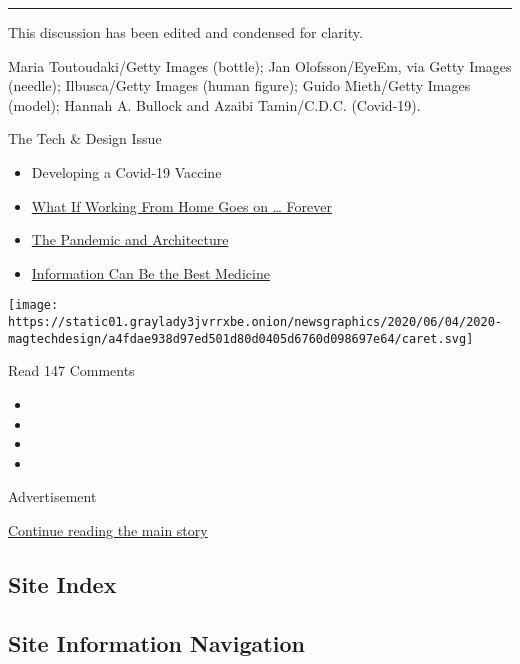 \begin{center}\rule{0.5\linewidth}{\linethickness}\end{center}

This discussion has been edited and condensed for clarity.

Maria Toutoudaki/Getty Images (bottle); Jan Olofsson/EyeEm, via Getty
Images (needle); Ilbusca/Getty Images (human figure); Guido Mieth/Getty
Images (model); Hannah A. Bullock and Azaibi Tamin/C.D.C. (Covid-19).

The Tech \& Design Issue

\begin{itemize}
\tightlist
\item
  Developing a Covid-19 Vaccine
\item
  \href{https://www.nytimes3xbfgragh.onion/interactive/2020/06/09/magazine/remote-work-covid.html}{What
  If Working From Home Goes on \ldots{} Forever}
\item
  \href{https://www.nytimes3xbfgragh.onion/interactive/2020/06/09/magazine/architecture-covid.html}{The
  Pandemic and Architecture}
\item
  \href{https://www.nytimes3xbfgragh.onion/interactive/2020/06/10/magazine/covid-data.html}{Information
  Can Be the Best Medicine}
\end{itemize}

\protect\hyperlink{}{} \protect\hyperlink{}{}

\texttt{[image: https://static01.graylady3jvrrxbe.onion/newsgraphics/2020/06/04/2020-magtechdesign/a4fdae938d97ed501d80d0405d6760d098697e64/caret.svg]}

Read 147 Comments

\begin{itemize}
\item
\item
\item
\item
\end{itemize}

Advertisement

\protect\hyperlink{after-bottom}{Continue reading the main story}

\hypertarget{site-index}{%
\subsection{Site Index}\label{site-index}}

\hypertarget{site-information-navigation}{%
\subsection{Site Information
Navigation}\label{site-information-navigation}}

